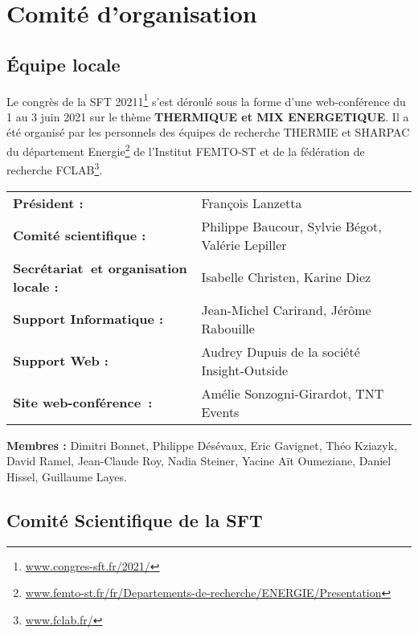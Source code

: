 \chapter{Comité d'organisation}

\section*{Équipe locale}

Le congrès de la SFT 20211\footnote{\url{www.congres-sft.fr/2021/}}  s’est déroulé sous la forme d’une web-conférence du 1\ier{} au 3 juin 2021 sur le thème \textbf{THERMIQUE et MIX ENERGETIQUE}. Il a été organisé par les personnels des équipes de recherche THERMIE et SHARPAC du département Energie\footnote{\url{www.femto-st.fr/fr/Departements-de-recherche/ENERGIE/Presentation}}  de l’Institut FEMTO-ST et de la fédération de recherche FCLAB\footnote{\url{www.fclab.fr/}}.

\vspace{1cm}
\noindent
\begin{tabular}{lll}
	\textbf{Président :} & François Lanzetta\\[2mm]
	\textbf{Comité scientifique :} & Philippe Baucour, Sylvie Bégot, Valérie Lepiller\\[2mm]
	\textbf{Secrétariat et organisation locale :} & Isabelle Christen, Karine Diez\\[2mm]
	\textbf{Support Informatique :} & Jean-Michel Carirand, Jérôme Rabouille\\[2mm]
	\textbf{Support Web :} & Audrey Dupuis de la société Insight-Outside\footnotemark \\[2mm]
        \textbf{Site web-conférence :} & Amélie Sonzogni-Girardot, TNT Events\footnotemark \\[4mm]
\end{tabular}

\noindent \textbf{Membres :} Dimitri Bonnet, Philippe Désévaux, Eric Gavignet, Théo Kziazyk, David Ramel, Jean-Claude Roy, Nadia Steiner, Yacine Aït Oumeziane, Daniel Hissel, Guillaume Layes.

\section*{Comité Scientifique de la SFT}

